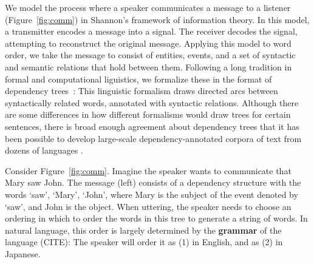 \documentclass[9pt,twocolumn,twoside,lineno]{pnas-new}
\newcommand{\key}[1]{\textbf{#1}}
\begin{document}
We model the process where a speaker communicates a message to a listener (Figure~\ref{fig:comm}) in Shannon's framework of information theory.
In this model, a transmitter encodes a message into a signal. The receiver decodes the signal, attempting to reconstruct the original message.
Applying this model to word order, we take the message to consist of entities, events, and a set of syntactic and semantic relations that hold between them.
Following a long tradition in formal and computational liguistics, we formalize these in the format of dependency trees~\cite{hays1964dependency,melcuk1988dependency,corbett1993heads,tesniere2015elements}:
This linguistic formalism draws directed arcs between syntactically related words, annotated with syntactic relations.
Although there are some differences in how different formalisms would draw trees for certain sentences, there is broad enough agreement about dependency trees that it has been possible to develop large-scale dependency-annotated corpora of text from dozens of languages \cite{nivre2017universal}.




Consider Figure~\ref{fig:comm}.
Imagine the speaker wants to communicate that Mary saw John.
The message (left) consists of a dependency structure with the words `saw', `Mary', `John', where Mary is the subject of the event denoted by `saw', and John is the object.
When uttering, the speaker needs to choose an ordering in which to order the words in this tree to generate a string of words.
In natural language, this order is largely determined by the \key{grammar} of the language (CITE):
The speaker will order it as (1) in English, and as (2) in Japanese.
\end{document}
